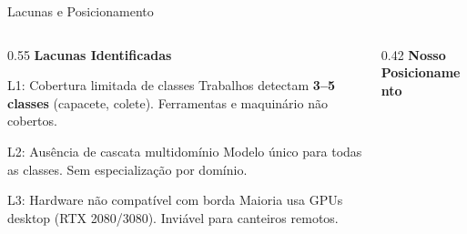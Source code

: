 \begin{frame}{Lacunas e Posicionamento}
  \vspace{-2mm}

  \begin{columns}[T]
    \begin{column}{0.55\textwidth}
      {\small\textcolor{skipcolor}{\textbf{Lacunas Identificadas}}}

      \vspace{1mm}

      {
      \begin{block}{\scriptsize L1: Cobertura limitada de classes}
        \scriptsize
        Trabalhos detectam \textbf{3--5 classes} (capacete, colete).
        Ferramentas e maquin\'{a}rio n\~{a}o cobertos.
      \end{block}
      }

      \vspace{1mm}

      {
      \begin{block}{\scriptsize L2: Aus\^{e}ncia de cascata multidom\'{i}nio}
        \scriptsize
        Modelo \'{u}nico para todas as classes.
        Sem especializa\c{c}\~{a}o por dom\'{i}nio.
      \end{block}
      }

      \vspace{1mm}

      {
      \begin{block}{\scriptsize L3: Hardware n\~{a}o compat\'{i}vel com borda}
        \scriptsize
        Maioria usa GPUs desktop (RTX 2080/3080).
        Invi\'{a}vel para canteiros remotos.
      \end{block}
      }
    \end{column}
    \begin{column}{0.42\textwidth}
      {\small\textcolor{headcolor}{\textbf{Nosso Posicionamento}}}

      \vspace{1mm}


\end{column}
\end{columns}
\end{frame}
